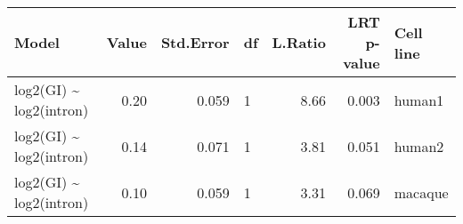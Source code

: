 \begin{table}[ht]
\centering
\begin{tabular}{lrrlrrl}
  \hline
Model & Value & Std.Error & df & L.Ratio & LRT p-value & Cell line \\ 
  \hline
log2(GI) \~{} log2(intron) & 0.20 & 0.059 & 1 & 8.66 & 0.003 & human1 \\ 
  log2(GI) \~{} log2(intron) & 0.14 & 0.071 & 1 & 3.81 & 0.051 & human2 \\ 
  log2(GI) \~{} log2(intron) & 0.10 & 0.059 & 1 & 3.31 & 0.069 & macaque \\ 
   \hline
\end{tabular}
\end{table}
